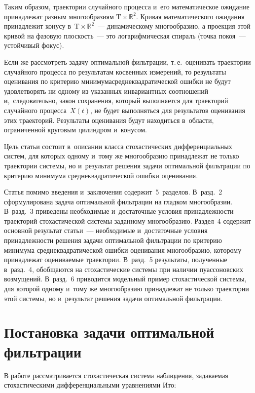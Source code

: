 \begin{multicols}{2}
Таким образом, траектории случайного процесса и~его математическое 
ожидание принадлежат разным многообразиям $\mathrm{T} \times \mathds{R}^2$. 
Кривая математического ожидания принадлежит конусу 
в~$\mathrm{T} \times \mathds{R}^2$~--- динамическому многообразию, а проекция 
этой кривой на фазовую плоскость~--- это логарифмическая спираль (точка покоя~--- 
устойчивый фокус).

Если же рассмотреть задачу оптимальной фильт\-ра\-ции, т.\,е.\ оценивать траектории 
случайного процесса по результатам косвенных измерений, то результаты оценивания 
по критерию минимума\linebreak среднеквадратической ошибки не будут удовлетворять ни одному 
из указанных инвариантных соотношений и,~следовательно, закон сохранения, который 
выполняется для траекторий случайного процесса~$X(t)$, не будет выполняться для 
результатов оценивания этих траекторий. Результаты оценивания будут находиться 
в~об\-ласти, ограниченной круговым цилиндром и~конусом.

Цель статьи состоит в~описании класса стохастических дифференциальных 
систем, для которых одному и~тому же многообразию принадлежат не 
только траектории системы, но и~результат решения задачи оптимальной 
фильтрации по критерию минимума среднеквадратической ошибки оценивания.

Статья помимо введения и~заключения содержит~5~разделов. В~разд.~2 
сформулирована задача оптимальной фильтрации на гладком многообразии. 
В~разд.~3 приведены необходимые и~достаточные условия принадлежности 
траекторий стохастической системы заданному многообразию. Раздел~4 
содержит основной результат статьи~--- необходимые и~достаточные условия
 принадлежности решения задачи оптимальной фильтрации по критерию минимума 
 среднеквадратической ошибки оценивания многообразию, которому принадлежат 
 оцениваемые траектории. В~разд.~5 результаты, полученные в~разд.~4, 
 обобщаются на стохастические системы при наличии пуассоновских возмущений. 
 В~разд.~6 приводится модельный пример стохастической системы, для 
 которой одному и~тому же многообразию принадлежат не только 
 траектории этой системы, но и~результат решения задачи оптимальной фильтрации.



\section{Постановка задачи оптимальной фильтрации}

В работе рассматривается стохастическая система наблюдения, 
задаваемая стохастическими дифференциальными уравнениями Ито:


\end{multicols}
